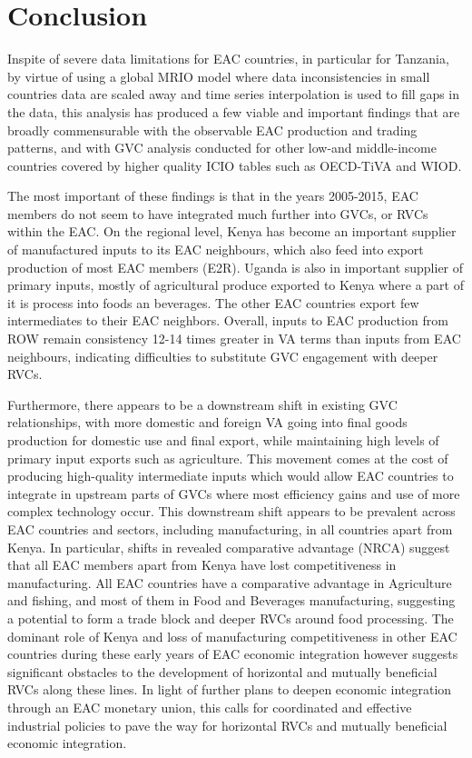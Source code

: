 \documentclass[a4paper]{article}
\begin{document}
\section{Conclusion} 

Inspite of severe data limitations for EAC countries, in particular for Tanzania, by virtue of using a global MRIO model where data inconsistencies in small countries data are scaled away and time series interpolation is used to fill gaps in the data, this analysis has produced a few viable and important findings that are broadly commensurable with the observable EAC production and trading patterns, and  with GVC analysis conducted for other low-and middle-income countries covered by higher quality ICIO tables such as OECD-TiVA and WIOD. \newline

The most important of these findings is that in the years 2005-2015, EAC members do not seem to have integrated much further into GVCs, or RVCs within the EAC. On the regional level, Kenya has become an important supplier of manufactured inputs to its EAC neighbours, which also feed into export production of most EAC members (E2R). Uganda is also in important supplier of primary inputs, mostly of agricultural produce exported to Kenya where a part of it is process into foods an beverages. The other EAC countries export few intermediates to their EAC neighbors. Overall, inputs to EAC production from ROW remain consistency 12-14 times greater in VA terms than inputs from EAC neighbours, indicating difficulties to substitute GVC engagement with deeper RVCs.  \newline

Furthermore, there appears to be a downstream shift in existing GVC relationships, with more domestic and foreign VA going into final goods production for domestic use and final export, while maintaining high levels of primary input exports such as agriculture. This movement comes at the cost of producing high-quality intermediate inputs which would allow EAC countries to integrate in upstream parts of GVCs where most efficiency gains and use of more complex technology occur. This downstream shift appears to be prevalent across EAC countries and sectors, including manufacturing, in all countries apart from Kenya. In particular, shifts in revealed comparative advantage (NRCA) suggest that all EAC members apart from Kenya have lost competitiveness in manufacturing. All EAC countries have a comparative advantage in Agriculture and fishing, and most of them in Food and Beverages manufacturing, suggesting a potential to form a trade block and deeper RVCs around food processing. The dominant role of Kenya and loss of manufacturing competitiveness in other EAC countries during these early years of EAC economic integration however suggests significant obstacles to the development of horizontal and mutually beneficial RVCs along these lines. In light of further plans to deepen economic integration through an EAC monetary union, this calls for coordinated and effective industrial policies to pave the way for horizontal RVCs and mutually beneficial economic integration. \newline 
\end{document}
